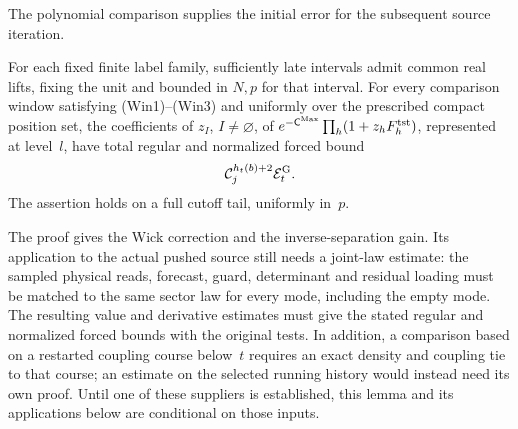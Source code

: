The polynomial comparison supplies the initial error for the subsequent source iteration.
\begin{lemma}\label{lem:E-source-polynomial}
For each fixed finite label family, sufficiently late intervals admit common real lifts, fixing the unit and bounded in $N,p$ for that interval. For every comparison window satisfying (Win1)--(Win3) and uniformly over the prescribed compact position set, the coefficients of $z_I$, $I\ne\varnothing$, of $e^{-\mathsf C^{\rm Max}}\prod_h(1+z_hF^{\rm tst}_h)$, represented at level~$l$, have total regular and normalized forced bound
\begin{equation*}
 \mathcal C_j^{h_t(b)+2}\mathcal E_t^{\rm G}.
\end{equation*}
The assertion holds on a full cutoff tail, uniformly in~$p$.
\end{lemma}
The proof gives the Wick correction and the inverse-separation gain. Its
application to the actual pushed source still needs a joint-law estimate:
the sampled physical reads, forecast, guard, determinant and residual
loading must be matched to the same sector law for every mode, including
the empty mode. The resulting value and derivative estimates must give
the stated regular and normalized forced bounds with the original tests.
In addition, a comparison based on a restarted coupling course below~$t$
requires an exact density and coupling tie to that course; an estimate
on the selected running history would instead need its own proof. Until
one of these suppliers is established, this lemma and its applications
below are conditional on those inputs.
